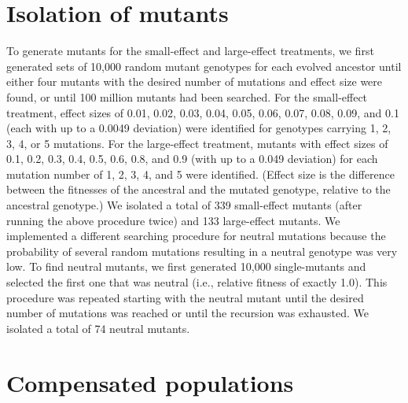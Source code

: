 \documentclass[11pt]{article}
\begin{document}
\section*{Isolation of mutants}

To generate mutants for the small-effect and large-effect treatments,
we first generated sets of 10,000 random mutant genotypes
for each evolved ancestor until either four mutants
with the desired number of mutations and effect size were found,
or until 100 million mutants had been searched.
%
For the small-effect treatment, effect sizes of
0.01, 0.02, 0.03, 0.04, 0.05, 0.06, 0.07, 0.08, 0.09, and 0.1
(each with up to a 0.0049 deviation) were identified for genotypes carrying
1, 2, 3, 4, or 5 mutations.
%
For the large-effect treatment, mutants with effect sizes of
0.1, 0.2, 0.3, 0.4, 0.5, 0.6, 0.8, and 0.9 (with up to a 0.049 deviation)
for each mutation number of 1, 2, 3, 4, and 5 were identified.
%
(Effect size is the difference between
the fitnesses of the ancestral and the mutated genotype,
relative to the ancestral genotype.)
%
We isolated a total of 339 small-effect mutants
(after running the above procedure twice) and 133 large-effect mutants.
%
We implemented a different searching procedure for neutral mutations
because the probability of several random mutations resulting
in a neutral genotype was very low.
%
To find neutral mutants, we first generated 10,000 single-mutants
and selected the first one that was neutral
(i.e., relative fitness of exactly 1.0).
%
This procedure was repeated starting with the neutral mutant until
the desired number of mutations was reached or until the
recursion was exhausted.
%
We isolated a total of 74 neutral mutants.



\section*{Compensated populations}
\end{document}
